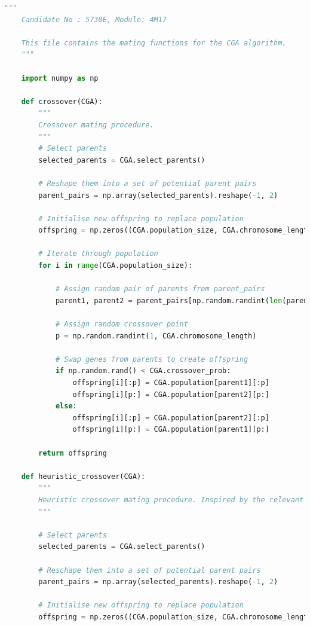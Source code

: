 \documentclass[10pt]{article}
\begin{document}
\begin{lstlisting}[language=Python, caption=mating\_functions.py, label=mating_functionspy]
    """
    Candidate No : 5730E, Module: 4M17 
    
    This file contains the mating functions for the CGA algorithm.
    """
    
    import numpy as np
    
    def crossover(CGA):
        """
        Crossover mating procedure. 
        """
        # Select parents
        selected_parents = CGA.select_parents()
    
        # Reshape them into a set of potential parent pairs
        parent_pairs = np.array(selected_parents).reshape(-1, 2)
    
        # Initialise new offspring to replace population
        offspring = np.zeros((CGA.population_size, CGA.chromosome_length))
    
        # Iterate through population
        for i in range(CGA.population_size):
    
            # Assign random pair of parents from parent_pairs
            parent1, parent2 = parent_pairs[np.random.randint(len(parent_pairs))]
    
            # Assign random crossover point
            p = np.random.randint(1, CGA.chromosome_length)
    
            # Swap genes from parents to create offspring
            if np.random.rand() < CGA.crossover_prob:
                offspring[i][:p] = CGA.population[parent1][:p]
                offspring[i][p:] = CGA.population[parent2][p:]
            else:
                offspring[i][:p] = CGA.population[parent2][:p]
                offspring[i][p:] = CGA.population[parent1][p:]
    
        return offspring
    
    def heuristic_crossover(CGA):
        """
        Heuristic crossover mating procedure. Inspired by the relevant section in https://doi.org/10.1002/0471671746.ch3
        """
    
        # Select parents
        selected_parents = CGA.select_parents()
    
        # Reschape them into a set of potential parent pairs
        parent_pairs = np.array(selected_parents).reshape(-1, 2)
    
        # Initialise new offspring to replace population
        offspring = np.zeros((CGA.population_size, CGA.chromosome_length))
    

\end{lstlisting}
\end{document}
